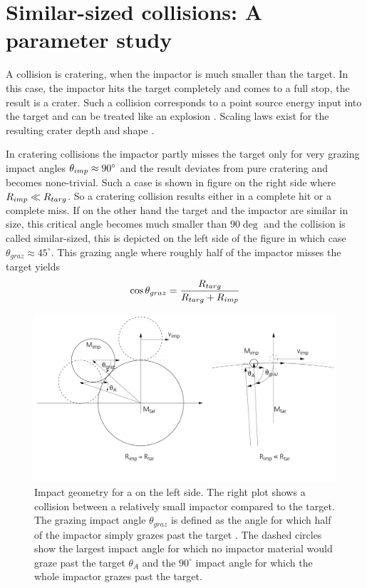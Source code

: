 \newpage
\chapter{Similar-sized collisions: A parameter study}
\graphicspath{{./03figs/}}

A collision is cratering, when the impactor is much smaller than the target. In this case, the impactor hits the target completely and comes to a full stop, the result is a crater. Such a collision corresponds to a point source energy input into the target and can be treated like an explosion \citep{Melosh:2007p3502}. Scaling laws exist for the resulting crater depth and shape \citep{Holsapple:1993p3018}. 

In cratering collisions the impactor partly misses the target only for very grazing impact angles $\theta_{imp} \approx 90 ^\circ$ and the result deviates from pure cratering and becomes none-trivial. Such a case is shown in figure \label{ch03_fig03} on the right side where $R_{imp} \ll R_{targ}$. So a cratering collision results either in a complete hit or a complete miss. If on the other hand the target and the impactor are similar in size, this critical angle becomes much smaller than $90 \deg$ and the collision is called similar-sized, this is depicted on the left side of the figure in which case $\theta_{graz} \approx 45^\circ$. This grazing angle where roughly half of the impactor misses the target yields
\begin{equation}
\label{ch03_eq001}
\cos{ \theta_{graz} }= \frac{R_{targ}}{R_{targ} + R_{imp}}
\end{equation}

\begin{figure}
\begin{center}
\includegraphics[scale=0.4]{03_grazing}
\caption{Impact geometry for a \SSC on the left side. The right plot shows a collision between a relatively small impactor compared to the target. The grazing impact angle $\theta_{graz}$ is defined as the angle for which half of the impactor simply grazes past the target \citep{Asphaug:2010p3539}. The dashed circles show the largest impact angle for which no impactor material would graze past the target $\theta_A$ and the $90^\circ$ impact angle for which the whole impactor grazes past the target.}
\label{ch03_fig03}
\end{center}
\end{figure}

